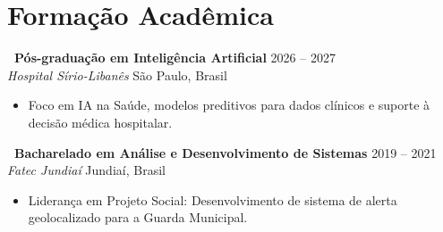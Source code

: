 \documentclass[10pt,a4paper]{article}
\begin{document}
\section{Formação Acadêmica}

\noindent\textbf{\textbullet~Pós-graduação em Inteligência Artificial} \hfill 2026 -- 2027 \\
\textit{Hospital Sírio-Libanês} \hfill São Paulo, Brasil
\begin{itemize}[leftmargin=*,label=\textendash,itemsep=2pt,parsep=0pt,topsep=2pt]
  \item Foco em IA na Saúde, modelos preditivos para dados clínicos e suporte à decisão médica hospitalar.
\end{itemize}

\vspace{4pt}

\noindent\textbf{\textbullet~Bacharelado em Análise e Desenvolvimento de Sistemas} \hfill 2019 -- 2021 \\
\textit{Fatec Jundiaí} \hfill Jundiaí, Brasil
\begin{itemize}[leftmargin=*,label=\textendash,itemsep=2pt,parsep=0pt,topsep=2pt]
  \item Liderança em Projeto Social: Desenvolvimento de sistema de alerta geolocalizado para a Guarda Municipal.
\end{itemize}
\end{document}
